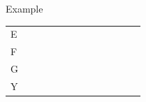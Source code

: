 \documentclass{bredelebeamer}
\begin{document}
\begin{frame}{Example}
\begin{table}[]
\begin{tabular}{*{13}{p{0.4cm}}}
\multicolumn{1}{l|}{E}  & \multicolumn{1}{l|}{} & \multicolumn{1}{l|}{} & \multicolumn{1}{l|}{} & \multicolumn{1}{l|}{} & \multicolumn{1}{l|}{} & \multicolumn{1}{l|}{} & \multicolumn{1}{l|}{} & \multicolumn{1}{l|}{} & \multicolumn{1}{l|}{} & \multicolumn{1}{l|}{} & \multicolumn{1}{l|}{} & \multicolumn{1}{l|}{} \\ \cline{2-13} 
\multicolumn{1}{l|}{F}  & \multicolumn{1}{l|}{} & \multicolumn{1}{l|}{} & \multicolumn{1}{l|}{} & \multicolumn{1}{l|}{} & \multicolumn{1}{l|}{} & \multicolumn{1}{l|}{} & \multicolumn{1}{l|}{} & \multicolumn{1}{l|}{} & \multicolumn{1}{l|}{} & \multicolumn{1}{l|}{} & \multicolumn{1}{l|}{} & \multicolumn{1}{l|}{} \\ \cline{2-13} 
\multicolumn{1}{l|}{G}  & \multicolumn{1}{l|}{} & \multicolumn{1}{l|}{} & \multicolumn{1}{l|}{} & \multicolumn{1}{l|}{} & \multicolumn{1}{l|}{} & \multicolumn{1}{l|}{} & \multicolumn{1}{l|}{} & \multicolumn{1}{l|}{} & \multicolumn{1}{l|}{} & \multicolumn{1}{l|}{} & \multicolumn{1}{l|}{} & \multicolumn{1}{l|}{} \\ \cline{2-13} 
\multicolumn{1}{l|}{Y}  & \multicolumn{1}{l|}{} & \multicolumn{1}{l|}{} & \multicolumn{1}{l|}{} & \multicolumn{1}{l|}{} & \multicolumn{1}{l|}{} & \multicolumn{1}{l|}{} & \multicolumn{1}{l|}{} & \multicolumn{1}{l|}{} & \multicolumn{1}{l|}{} & \multicolumn{1}{l|}{} & \multicolumn{1}{l|}{} & \multicolumn{1}{l|}{} \\ \cline{2-13} 
\end{tabular}
\end{table}
  
 \end{frame}
 
\end{document}
